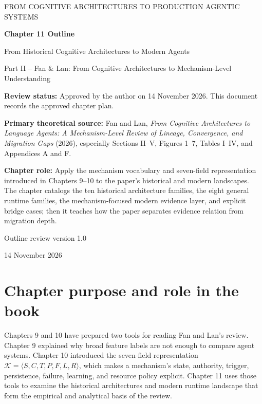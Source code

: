 


\thispagestyle{empty}
\begin{center}
{\sffamily\Large\color{BookBlue} FROM COGNITIVE ARCHITECTURES TO PRODUCTION AGENTIC SYSTEMS\par}
\vspace{1.2cm}
{\sffamily\huge\bfseries\color{BookBlue} Chapter 11 Outline\par}
\vspace{0.45cm}
{\sffamily\LARGE From Historical Cognitive Architectures to Modern Agents\par}
\vspace{0.8cm}
{\large Part II -- Fan \& Lan: From Cognitive Architectures to Mechanism-Level Understanding\par}
\vfill
\begin{learningbox}
\textbf{Review status:} Approved by the author on 14 November 2026. This document records the approved chapter plan.

\textbf{Primary theoretical source:} Fan and Lan, \emph{From Cognitive Architectures to Language Agents: A Mechanism-Level Review of Lineage, Convergence, and Migration Gaps} (2026), especially Sections II--V, Figures 1--7, Tables I--IV, and Appendices A and F.

\textbf{Chapter role:} Apply the mechanism vocabulary and seven-field representation introduced in Chapters 9--10 to the paper's historical and modern landscapes. The chapter catalogs the ten historical architecture families, the eight general runtime families, the mechanism-focused modern evidence layer, and explicit bridge cases; then it teaches how the paper separates evidence relation from migration depth.
\end{learningbox}
\vfill
{\sffamily\large Outline review version 1.0\par}
{\small 14 November 2026\par}
\end{center}
\clearpage

\setcounter{chapter}{11}
\section{Chapter purpose and role in the book}
Chapters 9 and 10 have prepared two tools for reading Fan and Lan's review. Chapter 9 explained why broad feature labels are not enough to compare agent systems. Chapter 10 introduced the seven-field representation \(\mathcal{K}=\langle S,C,T,P,F,L,R\rangle\), which makes a mechanism's state, authority, trigger, persistence, failure, learning, and resource policy explicit. Chapter 11 uses those tools to examine the historical architectures and modern runtime landscape that form the empirical and analytical basis of the review.

